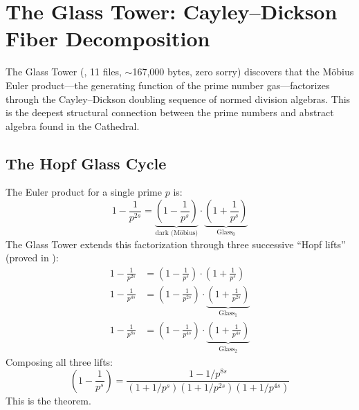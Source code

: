 \section{The Glass Tower: Cayley--Dickson Fiber Decomposition}
\label{sec:glass-tower}

The Glass Tower (, 11 files, $\sim$167{,}000
bytes, zero sorry) discovers that the M\"obius Euler product---the
generating function of the prime number gas---factorizes through the
Cayley--Dickson doubling sequence of normed division algebras. This is
the deepest structural connection between the prime numbers and
abstract algebra found in the Cathedral.

\subsection{The Hopf Glass Cycle}

The Euler product for a single prime $p$ is:
\[
  1 - \frac{1}{p^{2s}} = \underbrace{\left(1 - \frac{1}{p^s}\right)}_{\text{dark (M\"obius)}}
  \cdot \underbrace{\left(1 + \frac{1}{p^s}\right)}_{\text{Glass}_0}
\]
The Glass Tower extends this factorization through three successive
``Hopf lifts'' (proved in ):
\begin{align}
  1 - \frac{1}{p^{2s}} &= \left(1 - \frac{1}{p^s}\right)
  \cdot \left(1 + \frac{1}{p^s}\right) \\
  1 - \frac{1}{p^{4s}} &= \left(1 - \frac{1}{p^{2s}}\right)
  \cdot \underbrace{\left(1 + \frac{1}{p^{2s}}\right)}_{\text{Glass}_1} \\
  1 - \frac{1}{p^{8s}} &= \left(1 - \frac{1}{p^{4s}}\right)
  \cdot \underbrace{\left(1 + \frac{1}{p^{4s}}\right)}_{\text{Glass}_2}
\end{align}
Composing all three lifts:
\begin{equation}
  \left(1 - \frac{1}{p^s}\right) = \frac{1 - 1/p^{8s}}
  {\left(1 + 1/p^s\right)\left(1 + 1/p^{2s}\right)\left(1 + 1/p^{4s}\right)}
  \label{eq:glass-full-cycle}
\end{equation}
This is the  theorem.

